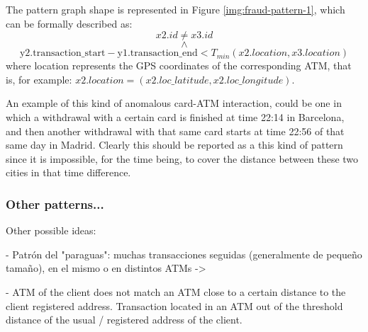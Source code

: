 The pattern graph shape is represented in Figure \ref{img:fraud-pattern-1}, which can be formally described as:
$$
x2.id \ne x3.id 
$$
$$\land$$
$$
\text{y2.transaction\_start} - \text{y1.transaction\_end} < T_{min}(x2.location, x3.location)
$$
where location represents the GPS coordinates of the corresponding ATM, that is, for example: $x2.location = (x2.loc\_latitude, x2.loc\_longitude)$.

\begin{comment}
$$
\small
x2.id \ne x3.id \ \land \ \text{y2.transaction\_start} - \text{y1.transaction\_end} < T_{min}(x2.location, x3.location)
$$
\end{comment}

An example of this kind of anomalous card-ATM interaction, could be one in which a withdrawal with a certain card is finished at time 22:14 in Barcelona, and then another withdrawal with that same card starts at time 22:56 of that same day in Madrid. Clearly this should be reported as a this kind of pattern since it is impossible, for the time being, to cover the distance between these two cities in that time difference.



\subsubsection{Other patterns...}
Other possible ideas:

- Patrón del "paraguas": muchas transacciones seguidas (generalmente de pequeño tamaño), en el mismo o en distintos ATMs -> %

- ATM of the client does not match an ATM close to a certain distance to the client registered address.
Transaction located in an ATM out of the threshold distance of the usual / registered address of the client.